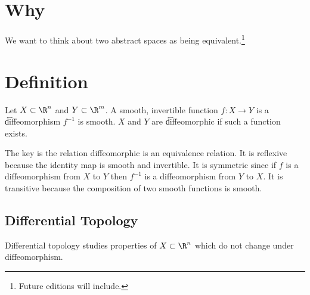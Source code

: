 

\section*{Why}

We want to think about two abstract spaces as being equivalent.\footnote{Future editions will include.}

\section*{Definition}

Let $X \subset \R ^n$ and $Y \subset \R ^m$.
A smooth, invertible function $f: X \to Y$ is a \t{diffeomorphism} $f^{-1}$ is smooth.
$X$ and $Y$ are \t{diffeomorphic} if such a function exists.

The key is the relation diffeomorphic is an equivalence relation.
It is reflexive because the identity map is smooth and invertible.
It is symmetric since if $f$ is a diffeomorphism from $X$ to $Y$ then $f^{-1}$ is a diffeomorphism from $Y$ to $X$.
It is transitive because the composition of two smooth functions is smooth.

\subsection*{Differential Topology}

Differential topology studies properties of $X \subset \R ^n$ which do not change under diffeomorphism.

\blankpage